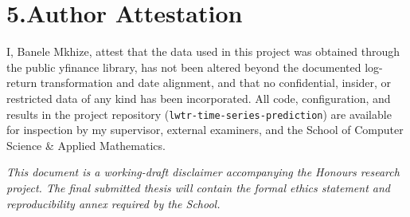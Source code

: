 \documentclass[11pt,a4paper]{article}
\begin{document}
\section{5.\quad Author Attestation}

I, Banele Mkhize, attest that the data used in this project was obtained
through the public yfinance library, has not been altered beyond the
documented log-return transformation and date alignment, and that no
confidential, insider, or restricted data of any kind has been
incorporated. All code, configuration, and results in the project
repository (\texttt{lwtr-time-series-prediction}) are available for
inspection by my supervisor, external examiners, and the School of
Computer Science \& Applied Mathematics.

\vspace{1cm}
\noindent\textit{This document is a working-draft disclaimer accompanying
the Honours research project. The final submitted thesis will contain the
formal ethics statement and reproducibility annex required by the School.}
\end{document}
